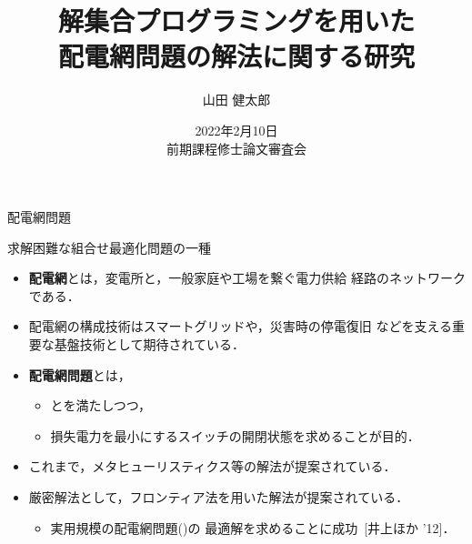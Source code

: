 \documentclass[dvipdfmx,11pt]{beamer}
\title{解集合プログラミングを用いた\\配電網問題の解法に関する研究}
\author[山田 健太郎]{山田 健太郎}
\date{2022年2月10日\\前期課程修士論文審査会}
\institute{番原研究室}
\begin{document}
\begin{frame}{}
  \titlepage
\end{frame}

\begin{frame}{配電網問題}
  \begin{alertblock}{}\centering
    求解困難な組合せ最適化問題の一種
  \end{alertblock}
  \vfill
  \begin{itemize}
  \item \alert{\bf 配電網}とは，変電所と，一般家庭や工場を繋ぐ電力供給
    経路のネットワークである．
  \item  配電網の構成技術はスマートグリッドや，災害時の停電復旧
         などを支える重要な基盤技術として期待されている．
  \item \alert{\bf 配電網問題}とは，
    \begin{itemize}
    \item {}とを満たしつつ，
    \item 損失電力を最小にするスイッチの開閉状態を求めることが目的．
    \end{itemize}
  \item これまで，メタヒューリスティクス等の解法が提案されている．
  \item 厳密解法として，フロンティア法を用いた解法が提案されている．
    \begin{itemize}
    \item 実用規模の配電網問題()の
      最適解を求めることに成功~[井上ほか '12]．
    \end{itemize}
  \end{itemize}
\end{frame}
\end{document}
